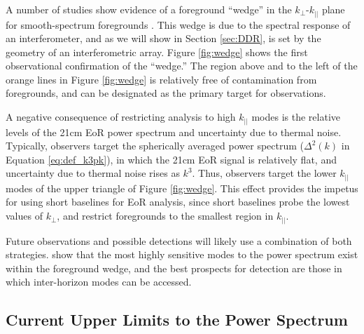 A number of studies show evidence of a foreground ``wedge'' in the $k_\perp$-$k_{||}$ plane for
smooth-spectrum foregrounds \cite[][e.g.]{Morales2012, DelaySpectrum, Liu2014}. This wedge 
is due to the spectral response of an interferometer, and as we will show in Section \ref{sec:DDR},
is set by the geometry of an interferometric array. Figure \ref{fig:wedge} shows the first
observational confirmation of the ``wedge.'' The region above and to the left of the orange lines in
Figure \ref{fig:wedge} is relatively free of contamination from foregrounds, and can be designated
as the primary target for observations.

A negative consequence of restricting analysis to high $k_{||}$ modes is the relative levels of the
21cm EoR power spectrum and uncertainty due to thermal noise. Typically, observers target the
spherically averaged power spectrum ($\Delta^2(k)$ in Equation \ref{eq:def_k3pk}), in which the 21cm
EoR signal is relatively flat, and uncertainty due to thermal noise rises as $k^3$. Thus, observers
target the lower $k_{||}$ modes of the upper triangle of Figure \ref{fig:wedge}. This effect
provides the impetus for using short baselines for EoR analysis, since short baselines probe the
lowest values of $k_\perp$, and restrict foregrounds to the smallest region in $k_{||}$.  

Future observations and possible detections will likely use a combination of both strategies.
\citet{Pober2014} show that the most highly sensitive modes to the power spectrum exist within the
foreground wedge, and the best prospects for detection are those in which inter-horizon modes can be
accessed.

\subsection{Current Upper Limits to the Power Spectrum}

